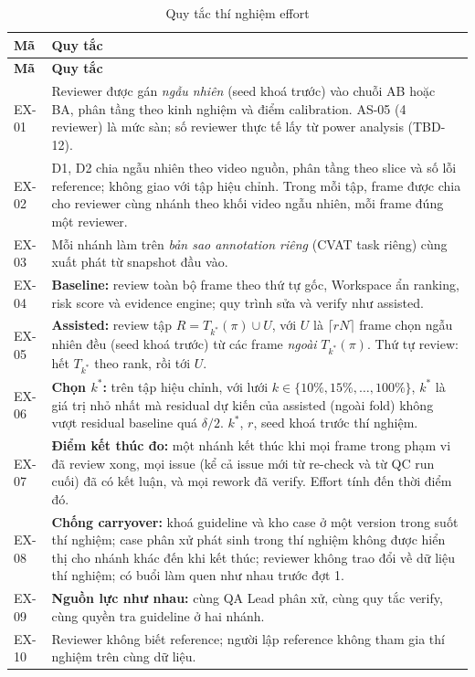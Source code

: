 \begin{xltabular}{\linewidth}{@{}L{1.3cm}Y@{}}
\caption{Quy tắc thí nghiệm effort}\label{tab:exprules}\\
\toprule
\textbf{Mã} & \textbf{Quy tắc}\\
\midrule
\endfirsthead
\toprule \textbf{Mã} & \textbf{Quy tắc}\\ \midrule
\endhead
\bottomrule
\endfoot
EX-01 & Reviewer được gán \emph{ngẫu nhiên} (seed khoá trước) vào chuỗi AB hoặc BA, phân tầng theo kinh nghiệm và điểm calibration. AS-05 (4 reviewer) là mức sàn; số reviewer thực tế lấy từ power analysis (TBD-12).\\
EX-02 & D1, D2 chia ngẫu nhiên theo video nguồn, phân tầng theo slice và số lỗi reference; không giao với tập hiệu chỉnh. Trong mỗi tập, frame được chia cho reviewer cùng nhánh theo khối video ngẫu nhiên, mỗi frame đúng một reviewer.\\
EX-03 & Mỗi nhánh làm trên \emph{bản sao annotation riêng} (CVAT task riêng) cùng xuất phát từ snapshot đầu vào.\\
EX-04 & \textbf{Baseline:} review toàn bộ frame theo thứ tự gốc, Workspace ẩn ranking, risk score và evidence engine; quy trình sửa và verify như assisted.\\
EX-05 & \textbf{Assisted:} review tập \(R = T_{k^\ast}(\pi) \cup U\), với \(U\) là \(\lceil rN \rceil\) frame chọn ngẫu nhiên đều (seed khoá trước) từ các frame \emph{ngoài} \(T_{k^\ast}(\pi)\). Thứ tự review: hết \(T_{k^\ast}\) theo rank, rồi tới \(U\).\\
EX-06 & \textbf{Chọn \(k^\ast\):} trên tập hiệu chỉnh, với lưới \(k \in \{10\%, 15\%, \dots, 100\%\}\), \(k^\ast\) là giá trị nhỏ nhất mà residual dự kiến của assisted (ngoài fold) không vượt residual baseline quá \(\delta/2\). \(k^\ast\), \(r\), seed khoá trước thí nghiệm.\\
EX-07 & \textbf{Điểm kết thúc đo:} một nhánh kết thúc khi mọi frame trong phạm vi đã review xong, mọi issue (kể cả issue mới từ re-check và từ QC run cuối) đã có kết luận, và mọi rework đã verify. Effort tính đến thời điểm đó.\\
EX-08 & \textbf{Chống carryover:} khoá guideline và kho case ở một version trong suốt thí nghiệm; case phân xử phát sinh trong thí nghiệm không được hiển thị cho nhánh khác đến khi kết thúc; reviewer không trao đổi về dữ liệu thí nghiệm; có buổi làm quen như nhau trước đợt 1.\\
EX-09 & \textbf{Nguồn lực như nhau:} cùng QA Lead phân xử, cùng quy tắc verify, cùng quyền tra guideline ở hai nhánh.\\
EX-10 & Reviewer không biết reference; người lập reference không tham gia thí nghiệm trên cùng dữ liệu.\\
\end{xltabular}

